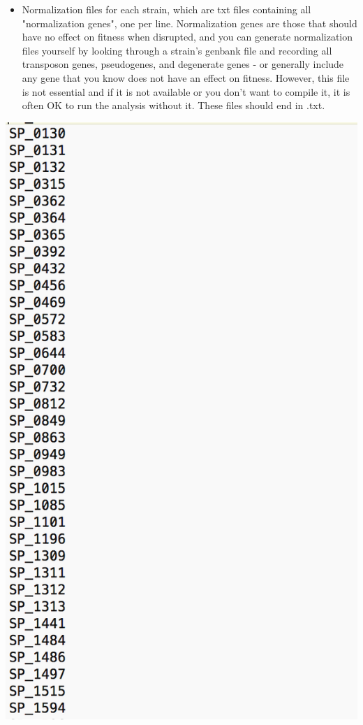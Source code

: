 \documentclass{article}
\begin{document}
\begin{itemize}

\item Normalization files for each strain, which are txt files containing all "normalization genes", one per line. Normalization genes are those that should have no effect on fitness when disrupted, and you can generate normalization files yourself by looking through a strain's genbank file and recording all transposon genes, pseudogenes, and degenerate genes - or generally include any gene that you know does not have an effect on fitness. However, this file is not essential and if it is not available or you don't want to compile it, it is often OK to run the analysis without it. These files should end in .txt.

\end{itemize}

\includegraphics[scale=0.5]{normalization.png}
\end{document}

